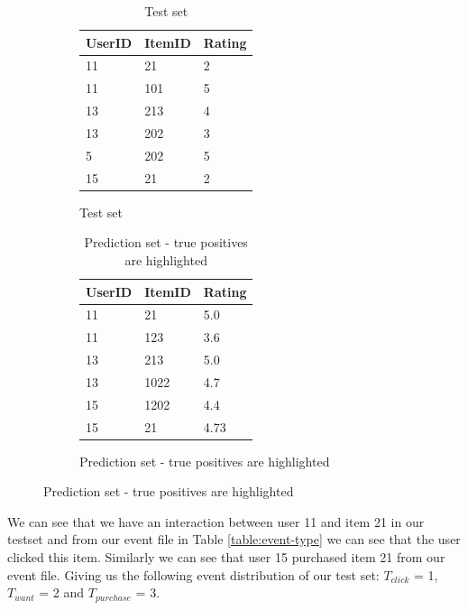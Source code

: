 \begin{figure}[H]
		\begin{subfigure}{.5\textwidth}
        \begin{table}[H]
        \centering
        	\begin{tabular}{*{3}l}
        	\toprule
        			UserID	&	ItemID	 &  Rating  	\\ \midrule
        			11		&	21		 &	2			\\
        			11		&	101		 &	5			\\
        			13		&	213		 &	4			\\
        			13		&	202		 &  3			\\
        			5		&	202		 &  5			\\
        			15		&	21		 &  2			\\
        	\bottomrule
        	\end{tabular}
        	\caption{Test set}
        \end{table}
        \end{subfigure}
        \begin{subfigure}{.5\textwidth}
            \begin{table}[H]
            \centering
            	\begin{tabular}{*{3}l}
            	\toprule
            		UserID	&	ItemID	 &  Rating  	\\ \midrule
            		\rowcolor{Gray}
            		11		&	21		 &	5.0			\\
            		11		&	123		 &	3.6			\\
            		\rowcolor{Gray}
            		13		&	213		 &	5.0			\\
            		13		&	1022	 &  4.7			\\
            		15		&	1202	 &  4.4			\\
            		\rowcolor{Gray}
            		15		&	21		 &  4.73		\\
            	\bottomrule
            	\end{tabular}	
            	\caption{Prediction set - true positives are highlighted}
            \end{table}
          \end{subfigure}
\end{figure}

We can see that we have an interaction between user 11 and item 21 in our testset and from our event file in
Table \ref{table:event-type} we can see that the user clicked this item. Similarly we can see that user 15 purchased
item 21 from our event file. Giving us the following event distribution of our test set: $T_{click}$ = 1, $T_{want}$ = 2 and
$T_{purchase}$ = 3. 

